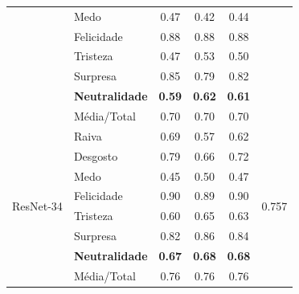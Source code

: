 \documentclass{beamer}
\begin{document}
\begin{frame}
\begin{table}[]
\begin{tabular}{llcccc}
                                    & Medo                  & 0.47              & 0.42               & 0.44              &                                 \\
                                    & Felicidade            & 0.88              & 0.88               & 0.88              &                                 \\
                                    & Tristeza              & 0.47              & 0.53               & 0.50              &                                 \\
                                    & Surpresa              & 0.85              & 0.79               & 0.82              &                                 \\
                                    & \scriptsize \textbf{Neutralidade}          & \scriptsize \textbf{0.59}              & \scriptsize \textbf{0.62}               & \scriptsize \textbf{0.61}              &                                 \\
                                    & Média/Total           & 0.70              & 0.70               & 0.70              &                                 \\ \hline
\multirow{8}{*}{ResNet-34} & Raiva        & 0.69     & 0.57      & 0.62     & \multirow{8}{*}{0.757} \\
                                    & Desgosto     & 0.79     & 0.66      & 0.72     &                                 \\
                                    & Medo         & 0.45     & 0.50      & 0.47     &                                 \\
                                    & Felicidade   & 0.90     & 0.89      & 0.90     &                                 \\
                                    & Tristeza     & 0.60     & 0.65      & 0.63     &                                 \\
                                    & Surpresa     & 0.82     & 0.86      & 0.84     &                                 \\
                                    & \scriptsize \textbf{Neutralidade} & \scriptsize \textbf{0.67}     & \scriptsize \textbf{0.68}      & \scriptsize \textbf{0.68}     &                                 \\
                                    & Média/Total  & 0.76     & 0.76      & 0.76     &                                 \\ \hline
\end{tabular}
\end{table} 
\end{frame}
\end{document}
